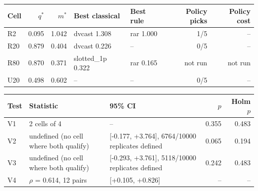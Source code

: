 \begin{tabular}{lrrllrr}
\hline
Cell & $q^*$ & $m^*$ & Best classical & Best rule & Policy picks & Policy cost \\
\hline
R2 & 0.095 & 1.042 & dvcast 1.308 & rar 1.000 & 1/5 & -- \\
R20 & 0.879 & 0.404 & dvcast 0.226 & -- & 0/5 & -- \\
R80 & 0.870 & 0.371 & slotted\_1p 0.322 & rar 0.165 & not run & not run \\
U20 & 0.498 & 0.602 & -- & -- & 0/5 & -- \\
\hline
\end{tabular}

\begin{tabular}{lllrr}
\hline
Test & Statistic & 95\% CI & $p$ & Holm $p$ \\
\hline
V1 & 2 cells of 4 & -- & 0.355 & 0.483 \\
V2 & undefined (no cell where both qualify) & [-0.177, +3.764], 6764/10000 replicates defined & 0.065 & 0.194 \\
V3 & undefined (no cell where both qualify) & [-0.293, +3.761], 5118/10000 replicates defined & 0.242 & 0.483 \\
V4 & $\rho$ = 0.614, 12 pairs & [+0.105, +0.826] & -- & -- \\
\hline
\end{tabular}
